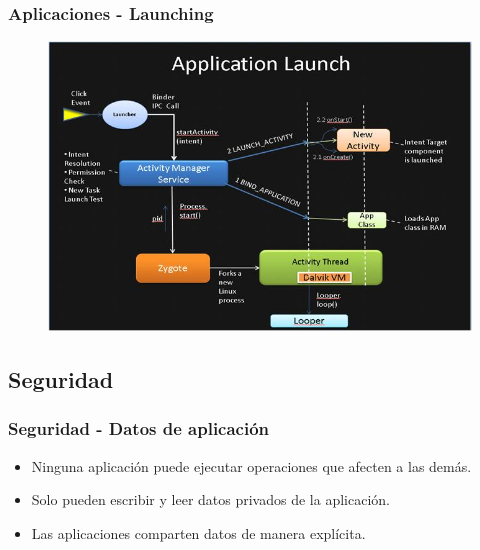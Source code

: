 \begin{frame}
  \frametitle{Aplicaciones - Launching}
    \begin{figure}
      \centering
      \includegraphics[scale=0.5]{images/launch-app.jpg}
    \end{figure}
\end{frame}

\subsection{Seguridad}
\begin{frame}
  \frametitle{Seguridad - Datos de aplicación}
  \begin{itemize}
    \item Ninguna aplicación puede ejecutar operaciones que afecten a las demás.
    
    \item Solo pueden escribir y leer datos privados de la aplicación.
    
    \item Las aplicaciones comparten datos de manera explícita.    
  \end{itemize}
\end{frame}

